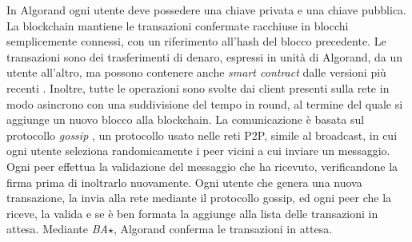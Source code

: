 In Algorand ogni utente deve possedere una chiave privata e una chiave pubblica. La blockchain mantiene le transazioni confermate racchiuse in blocchi semplicemente connessi, con un riferimento all'hash del blocco precedente. Le transazioni sono dei trasferimenti di denaro, espressi in unità di Algorand, da un utente all'altro, ma possono contenere anche \emph{smart contract} dalle versioni più recenti \cite{smartcontract2019algo, smartcontract2020algo}. Inoltre, tutte le operazioni sono svolte dai client presenti sulla rete in modo asincrono con una suddivisione del tempo in round, al termine del quale si aggiunge un nuovo blocco alla blockchain.
La comunicazione è basata sul protocollo \emph{gossip} \cite{kermarrec2007gossiping}, un protocollo usato nelle reti P2P, simile al broadcast, in cui ogni utente seleziona randomicamente i peer vicini a cui inviare un messaggio. Ogni peer effettua la validazione del messaggio che ha ricevuto, verificandone la firma prima di inoltrarlo nuovamente. Ogni utente che genera una nuova transazione, la invia alla rete mediante il protocollo gossip, ed ogni peer che la riceve, la valida e se è ben formata la aggiunge alla lista delle transazioni in attesa. Mediante \emph{BA$\star$}, Algorand conferma le transazioni in attesa.

